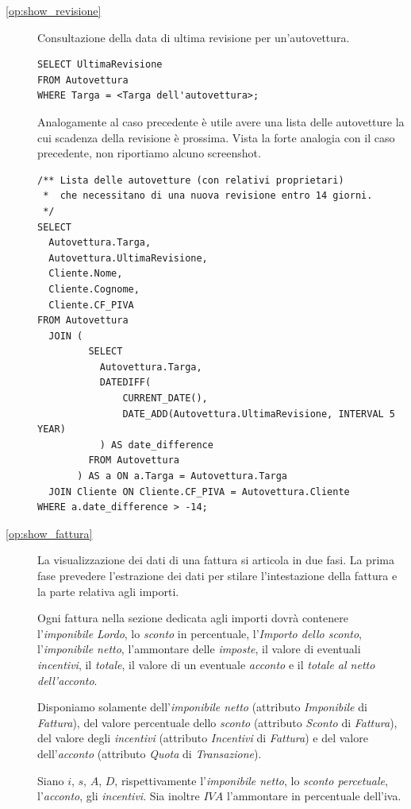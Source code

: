 \begin{description}
            \item[\ref{op:show_revisione}] Consultazione della data di ultima revisione per un'autovettura.
              \begin{lstlisting}
SELECT UltimaRevisione
FROM Autovettura
WHERE Targa = <Targa dell'autovettura>;
              \end{lstlisting}

              Analogamente al caso precedente è utile avere una lista delle autovetture la cui scadenza della revisione è prossima. Vista la forte analogia con il caso precedente, non riportiamo alcuno screenshot.
              \begin{lstlisting}
/** Lista delle autovetture (con relativi proprietari)
 *  che necessitano di una nuova revisione entro 14 giorni.
 */
SELECT
  Autovettura.Targa,
  Autovettura.UltimaRevisione,
  Cliente.Nome,
  Cliente.Cognome,
  Cliente.CF_PIVA
FROM Autovettura
  JOIN (
         SELECT
           Autovettura.Targa,
           DATEDIFF(
               CURRENT_DATE(),
               DATE_ADD(Autovettura.UltimaRevisione, INTERVAL 5 YEAR)
           ) AS date_difference
         FROM Autovettura
       ) AS a ON a.Targa = Autovettura.Targa
  JOIN Cliente ON Cliente.CF_PIVA = Autovettura.Cliente
WHERE a.date_difference > -14;
              \end{lstlisting}

            \item[\ref{op:show_fattura}] La visualizzazione dei dati di una fattura si articola in due fasi. La prima fase prevedere l'estrazione dei dati per stilare l'intestazione della fattura e la parte relativa agli importi.

            Ogni fattura nella sezione dedicata agli importi dovrà contenere l'\emph{imponibile Lordo}, lo \emph{sconto} in percentuale, l'\emph{Importo dello sconto}, l'\emph{imponibile netto}, l'ammontare delle \emph{imposte}, il valore di eventuali \emph{incentivi}, il \emph{totale}, il valore di un eventuale \emph{acconto} e il \emph{totale al netto dell'acconto}.

            Disponiamo solamente dell'\emph{imponibile netto} (attributo \emph{Imponibile} di \emph{Fattura}), del valore percentuale dello \emph{sconto} (attributo \emph{Sconto} di \emph{Fattura}), del valore degli \emph{incentivi} (attributo \emph{Incentivi} di \emph{Fattura}) e del valore dell'\emph{acconto} (attributo \emph{Quota} di \emph{Transazione}).

            Siano $i$, $s$, $A$, $D$, rispettivamente l'\emph{imponibile netto}, lo \emph{sconto percetuale}, l'\emph{acconto}, gli \emph{incentivi}. Sia inoltre $IVA$ l'ammontare in percentuale dell'iva.


\end{description}
